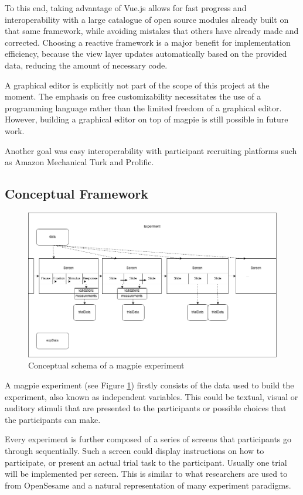 \documentclass[a4paper,11pt]{scrreprt}
\begin{document}
To this end, taking advantage of Vue.js allows for fast progress and interoperability with a large catalogue of open source modules already built on that same framework, while avoiding mistakes that others have already made and corrected. Choosing a reactive framework is a major benefit for implementation efficiency, because the view layer updates automatically based on the provided data, reducing the amount of necessary code.

A graphical editor is explicitly not part of the scope of this project at the moment. The emphasis on free customizability necessitates the use of a programming language rather than the limited freedom of a graphical editor. However, building a graphical editor on top of magpie is still possible in future work.

Another goal was easy interoperability with participant recruiting platforms such as Amazon Mechanical Turk and Prolific.

\subsection{Conceptual Framework}

\begin{figure}[h]
\includegraphics[width=\textwidth]{experiments_schema.png}
\caption{Conceptual schema of a magpie experiment}
\label{fig:concepts}
\end{figure}

A magpie experiment (see Figure \ref{fig:concepts}) firstly consists of the data used to build the experiment, also known as independent variables.
This could be textual, visual or auditory stimuli that are presented to the participants or possible choices that the participants can make.

Every experiment is further composed of a series of screens that participants go through sequentially. Such a screen could display instructions on how to participate, or present an actual trial task to the participant. Usually one trial will be implemented per screen. This is similar to what researchers are used to from OpenSesame \citep{Mathot2012} and a natural representation of many experiment paradigms.
\end{document}
